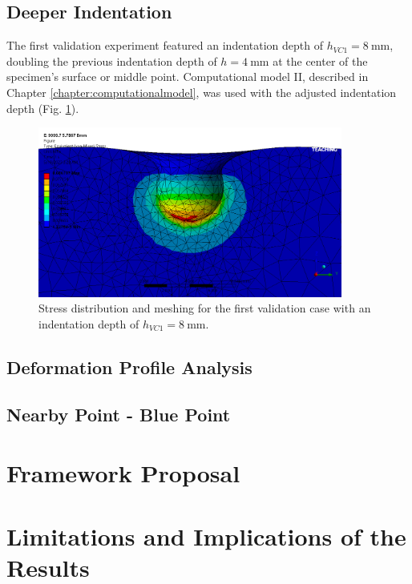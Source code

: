 \subsection{Deeper Indentation}
\label{subsection:8mm}
The first validation experiment featured an indentation depth of $h_{VC1}=\SI{8}{\milli \meter}$,
doubling the previous indentation depth of $h=\SI{4}{\milli \meter}$ at the center of the specimen's 
surface or middle point. Computational model II, described in Chapter \ref{chapter:computationalmodel},
was used with the adjusted indentation depth (Fig. \ref{fig:stressdis8mm}).

\begin{figure}%
	\centering
   \quad
   \includegraphics[width=10cm]{Images/validationcase/8mm/setstressdistribution.png}%
   \caption[Deeper Indentation - Stress distribution]{Stress distribution and meshing for the first validation case with an indentation depth of $h_{VC1}=\SI{8}{\milli \meter}$.}%
   \label{fig:stressdis8mm}%
\end{figure}



\subsection{Deformation Profile Analysis}
\label{subsection:defprofanalysis}


\subsection{Nearby Point - Blue Point}
\label{subsection:bluepoint}



\section{Framework Proposal}

\section{Limitations and Implications of the Results}



